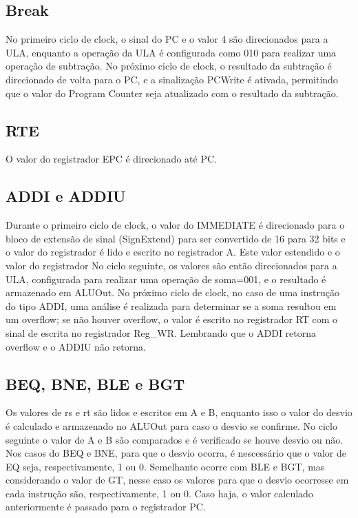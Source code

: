 \subsection{Break}

No primeiro ciclo de clock, o sinal do PC e o valor 4 são direcionados para a ULA, enquanto a operação da ULA é configurada como 010 para realizar uma operação de subtração. No próximo ciclo de clock, o resultado da subtração é direcionado de volta para o PC, e a sinalização PCWrite é ativada, permitindo que o valor do Program Counter seja atualizado com o resultado da subtração.

\subsection{RTE}

O valor do registrador EPC é direcionado até PC.

\subsection{ADDI e ADDIU}

Durante o primeiro ciclo de clock, o valor do IMMEDIATE é direcionado para o bloco de extensão de sinal (SignExtend) para ser convertido de 16 para 32 bits e o valor do registrador é lido e escrito no registrador A. Este valor estendido e o valor do registrador No ciclo seguinte, os valores são então direcionados para a ULA, configurada para realizar uma operação de soma=001, e o resultado é armazenado em ALUOut. No próximo ciclo de clock, no caso de uma instrução do tipo ADDI, uma análise é realizada para determinar se a soma resultou em um overflow; se não houver overflow, o valor é escrito no registrador RT com o sinal de escrita no registrador Reg\_WR. Lembrando que o ADDI retorna overflow e o ADDIU não retorna.

\subsection{BEQ, BNE, BLE e BGT}

Os valores de rs e rt são lidos e escritos em A e B, enquanto isso o valor do desvio é calculado e armazenado no ALUOut para caso o desvio se confirme. No ciclo seguinte o valor de A e B são comparados e é verificado se houve desvio ou não. Nos casos do BEQ e BNE, para que o desvio ocorra, é nescessário que o valor de EQ seja, respectivamente, 1 ou 0. Semelhante ocorre com BLE e BGT, mas considerando o valor de GT, nesse caso os valores para que o desvio ocorresse em cada instrução são, respectivamente, 1 ou 0. Caso haja, o valor calculado anteriormente é passado para o registrador PC.

